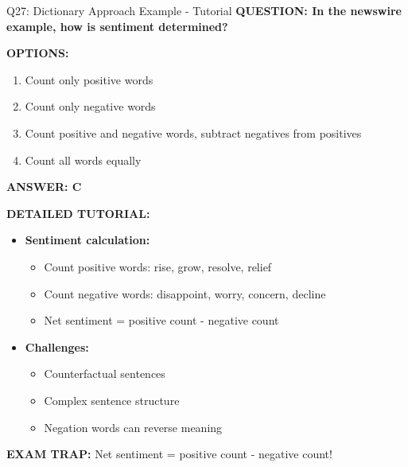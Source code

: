 \documentclass[8pt]{beamer}
\begin{document}
	\begin{frame}{Q27: Dictionary Approach Example - Tutorial}
		\fontsize{6.5}{7.5}\selectfont
		\textbf{QUESTION: In the newswire example, how is sentiment determined?}
		
		\vspace{0.1cm}
		\textbf{OPTIONS:}
		\begin{enumerate}
			\item Count only positive words
			\item Count only negative words
			\item Count positive and negative words, subtract negatives from positives
			\item Count all words equally
		\end{enumerate}
		
		\vspace{0.1cm}
		\textcolor{myblue}{\textbf{ANSWER: C}}
		
		\vspace{0.1cm}
		\textbf{DETAILED TUTORIAL:}
		\begin{itemize}
			\item \textbf{Sentiment calculation:}
			\begin{itemize}
				\item Count positive words: rise, grow, resolve, relief
				\item Count negative words: disappoint, worry, concern, decline
				\item Net sentiment = positive count - negative count
			\end{itemize}
			\item \textbf{Challenges:}
			\begin{itemize}
				\item Counterfactual sentences
				\item Complex sentence structure
				\item Negation words can reverse meaning
			\end{itemize}
		\end{itemize}
		
		\textcolor{myred}{\textbf{EXAM TRAP:}} Net sentiment = \textcolor{myblue}{positive count - negative count}!
	\end{frame}
	
\end{document}
